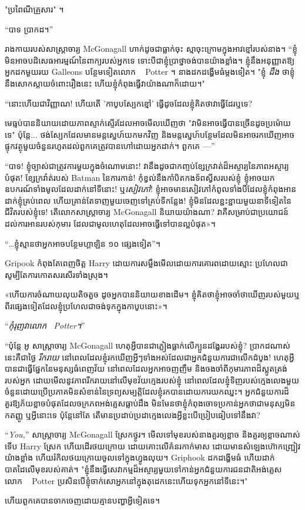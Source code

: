 "ប្រពៃណីគ្រួសារ" ។

“បាទ ប្រាកដ។”

រាងកាយរបស់សាស្រ្តាចារ្យ McGonagall ហាក់ដូចជាធ្លាក់ចុះ ស្មាចុះក្រោមក្នុងអាវខ្មៅរបស់នាង។ “ខ្ញុំ​មិន​អាច​បដិសេធ​អារម្មណ៍​នៃ​ពាក្យ​របស់​អ្នក​ទេ ទោះ​បី​ជា​ខ្ញុំ​ប្រាថ្នា​ចង់​បាន​យ៉ាង​ខ្លាំង។ ខ្ញុំ​នឹង​អនុញ្ញាត​ឱ្យ​អ្នក​ដក​មួយ​រយ​ Galleons បន្ថែម​ទៀត​លោក ~ Potter ។ នាងដកដង្ហើមធំម្តងទៀត។ "ខ្ញុំ \emph{ដឹង} ថាខ្ញុំនឹងសោកស្តាយចំពោះរឿងនេះ ហើយខ្ញុំកំពុងធ្វើវាយ៉ាងណាក៏ដោយ។"

“នោះហើយជាវិញ្ញាណ! ហើយតើ 'កាបូបស្បែកខ្មៅ' ធ្វើដូចដែលខ្ញុំគិតថាវាធ្វើដែរឬទេ?

មេធ្មប់បាននិយាយដោយភាពស្ទាក់ស្ទើរដែលអាចមើលឃើញថា "វាមិនអាចធ្វើបានច្រើនដូចប្រម៉ោយទេ" ប៉ុន្តែ... ថង់ស្បែកដែលមានមន្តស្នេហ៍យកមកវិញ និងមន្តស្នេហ៍បន្ថែមដែលមិនអាចរកឃើញអាចផ្ទុកវត្ថុមួយចំនួនរហូតដល់ពួកគេត្រូវបានហៅដោយអ្នកដាក់។ ពួកគេ —”

“បាទ! ខ្ញុំច្បាស់ជាត្រូវការមួយក្នុងចំណោមនោះ! វានឹងដូចជាកញ្ចប់ខ្សែក្រវាត់ដ៏អស្ចារ្យនៃភាពអស្ចារ្យបំផុត! ខ្សែក្រវ៉ាត់របស់ Batman នៃការកាន់! កុំខ្វល់នឹងកាំបិតកងទ័ពស្វីសរបស់ខ្ញុំ ខ្ញុំអាចយកឧបករណ៍ទាំងមូលដែលដាក់នៅទីនោះ! ឬ\emph{សៀវភៅ}! ខ្ញុំ​អាច​មាន​សៀវភៅ​កំពូល​ទាំង​បី​ដែល​ខ្ញុំ​កំពុង​អាន​ដាក់​ខ្ញុំ​គ្រប់​ពេល ហើយ​គ្រាន់​តែ​ទាញ​មួយ​ចេញ​ទៅ​គ្រប់​ទី​កន្លែង! ខ្ញុំមិនដែលខ្ជះខ្ជាយមួយនាទីទៀតនៃជីវិតរបស់ខ្ញុំទេ! តើ​លោក​សាស្ត្រាចារ្យ McGonagall និយាយ​យ៉ាង​ណា? វា​គឺ​សម្រាប់​ជា​ប្រយោជន៍​ដល់​ការ​អាន​របស់​កុមារ ដែល​ជា​មូលហេតុ​ដែល​អាច​ធ្វើ​ទៅ​បាន​ល្អ​បំផុត»។

“…ខ្ញុំស្មានថាអ្នកអាចបន្ថែមហ្គាឡិន ១០ ផ្សេងទៀត”។

Gripook កំពុងតែពេញចិត្ត Harry ដោយការសម្លឹងមើលដោយការគោរពដោយស្មោះ ប្រហែលជាសូម្បីតែការកោតសរសើរទាំងស្រុង។

«ហើយ​ការ​ចំណាយ​លុយ​តិច​តួច ដូច​អ្នក​បាន​និយាយ​ខាង​ដើម។ ខ្ញុំ​គិត​ថា​ខ្ញុំ​អាច​ចាំ​ថា​ឃើញ​របស់​មួយ​ឬ​ពីរ​ផ្សេង​ទៀត​ដែល​ខ្ញុំ​ប្រហែល​ជា​ចង់​ទុក​ក្នុង​កាបូប​នោះ»។

“\emph{កុំរុញវាលោក~ Potter។}”

“ប៉ុន្តែ អូ សាស្រ្តាចារ្យ McGonagall ហេតុអ្វីបានជាភ្លៀងធ្លាក់លើក្បួនដង្ហែររបស់ខ្ញុំ? ប្រាកដណាស់នេះគឺជាថ្ងៃ \emph{រីករាយ} នៅពេលដែលខ្ញុំរកឃើញអ្វីៗទាំងអស់ដែលជាអ្នកជំនួយការជាលើកដំបូង! ហេតុអ្វីបានជាធ្វើផ្នែកនៃមនុស្សធំពេញវ័យ នៅពេលដែលអ្នកអាចញញឹម និងចងចាំពីកុមារភាពដ៏ស្លូតត្រង់របស់អ្នក ដោយមើលនូវភាពរីករាយនៅលើមុខវ័យក្មេងរបស់ខ្ញុំ នៅពេលដែលខ្ញុំទិញរបស់ក្មេងលេងមួយចំនួនដោយប្រើប្រភាគមិនសំខាន់នៃទ្រព្យសម្បត្តិដែលខ្ញុំរកបានដោយការយកឈ្នះ។ អ្នកជំនួយការដ៏គួរឱ្យភ័យខ្លាចបំផុតដែលចក្រភពអង់គ្លេសធ្លាប់ដឹង មិនមែនថាខ្ញុំកំពុងចោទប្រកាន់អ្នកថាជាមនុស្សមិនកតញ្ញូ ឬអ្វីនោះទេ ប៉ុន្តែនៅតែ តើមានប្រដាប់ប្រដាក្មេងលេងអ្វីខ្លះបើប្រៀបធៀបទៅនឹងវា?

“\emph{You,}” សាស្ត្រាចារ្យ McGonagall ស្រែកថ្ងូរ។ មើលទៅមុខរបស់នាងគួរឲ្យខ្លាច និងគួរឲ្យខ្លាចណាស់ ទើប Harry ស្រែក ហើយដើរថយក្រោយ ដោយគោះលើគំនរកាក់មាស ដោយមានសំឡេងហ៊ោកញ្ជ្រៀវយ៉ាងខ្លាំង ហើយរំកិលថយក្រោយចូលទៅក្នុងហ្វូងលុយ។ Griphook ដកដង្ហើមធំ ហើយដាក់បាតដៃលើមុខរបស់គាត់។ "ខ្ញុំនឹងធ្វើសេវាកម្មដ៏អស្ចារ្យមួយទៅកាន់អ្នកជំនួយការជនជាតិអង់គ្លេស លោក ~ Potter ប្រសិនបើខ្ញុំចាក់សោអ្នកនៅក្នុងតុដេកនេះហើយទុកអ្នកនៅទីនេះ។"

ហើយ​ពួក​គេ​បាន​ចាក​ចេញ​ដោយ​គ្មាន​បញ្ហា​អ្វី​ទៀត​ទេ។

